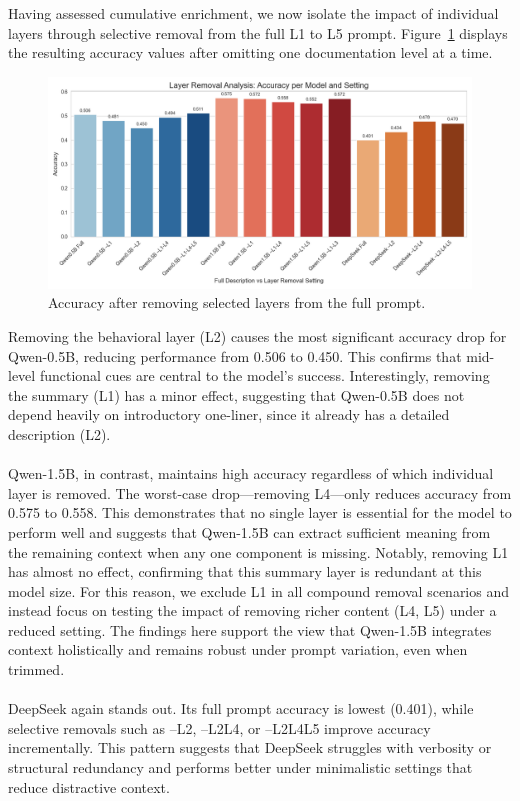 \documentclass[a4paper]{usiinfbachelorproject}
\begin{document}
Having assessed cumulative enrichment, we now isolate the impact of individual layers through selective removal from the full L1 to L5 prompt. Figure~\ref{fig:ablation-accuracy} displays the resulting accuracy values after omitting one documentation level at a time.
\begin{figure}[H]\centering
  \includegraphics[width=0.95\linewidth]{figures/ablation_accuracy.png}
  \caption{Accuracy after removing selected layers from the full prompt.}
  \label{fig:ablation-accuracy}
\end{figure}
\noindent
Removing the behavioral layer (L2) causes the most significant accuracy drop for Qwen-0.5B, reducing performance from 0.506 to 0.450. This confirms that mid-level functional cues are central to the model's success. Interestingly, removing the summary (L1) has a minor effect, suggesting that Qwen-0.5B does not depend heavily on introductory one-liner, since it already has a detailed description (L2). \\
\\
Qwen-1.5B, in contrast, maintains high accuracy regardless of which individual layer is removed. The worst-case drop—removing L4—only reduces accuracy from 0.575 to 0.558. This demonstrates that no single layer is essential for the model to perform well and suggests that Qwen-1.5B can extract sufficient meaning from the remaining context when any one component is missing. Notably, removing L1 has almost no effect, confirming that this summary layer is redundant at this model size. For this reason, we exclude L1 in all compound removal scenarios and instead focus on testing the impact of removing richer content (L4, L5) under a reduced setting. The findings here support the view that Qwen-1.5B integrates context holistically and remains robust under prompt variation, even when trimmed. \\
\\
DeepSeek again stands out. Its full prompt accuracy is lowest (0.401), while selective removals such as –L2, –L2L4, or –L2L4L5 improve accuracy incrementally. This pattern suggests that DeepSeek struggles with verbosity or structural redundancy and performs better under minimalistic settings that reduce distractive context.
\end{document}
